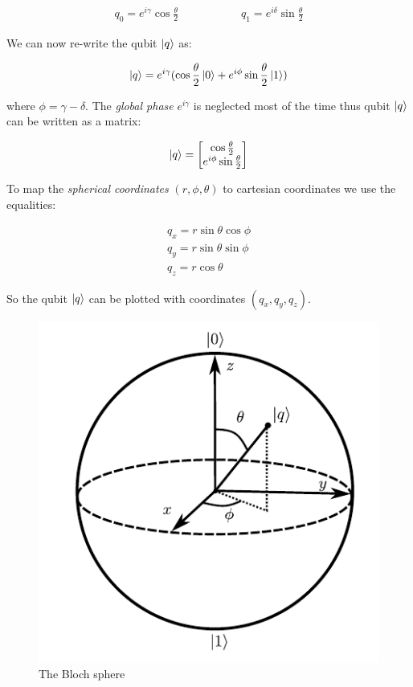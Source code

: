 \begin{align}
    q_0 = e^{i\gamma}\cos\frac{\theta}{2} &\hspace{2cm}
    q_1 = e^{i\delta}\sin\frac{\theta}{2}
\end{align}

We can now re-write the qubit $\ket{q}$ as:

\begin{equation}
    \ket{q}=e^{i\gamma}(\cos\frac{\theta}{2}\ket{0}+e^{i\phi}\sin\frac{\theta}{2}\ket{1})
\end{equation}

where $\phi=\gamma-\delta$. The \textit{global phase} $e^{i\gamma}$ is neglected most of the time
thus qubit $\ket{q}$ can be written as a matrix:

\begin{equation}
    \ket{q}=\begin{bmatrix}
        \cos\frac{\theta}{2}\\
        e^{i\phi}\sin\frac{\theta}{2}
    \end{bmatrix}
\end{equation}

To map the \emph{spherical coordinates} $(r,\phi,\theta)$ to cartesian coordinates we use the equalities:

\begin{gather}
    q_x=r\sin\theta\cos\phi\\
    q_y=r\sin\theta\sin\phi\\
    q_z=r\cos\theta
\end{gather}

So the qubit $\ket{q}$ can be plotted with coordinates $(q_x,q_y,q_z)$.

\begin{figure}[ht]
    \centering
    \includegraphics{images/3_Quantum_Computing/bloch_sphere.pdf}
    \caption{The Bloch sphere}
    \label{fig:bloch_sphere}
\end{figure}

